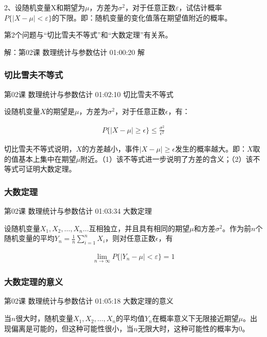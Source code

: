 \documentclass[UTF8]{ctexbook}
\begin{document}
2、设随机变量X和期望为$\mu$，方差为$\sigma^{2}$，对于任意正数$\varepsilon$，试估计概率$P\{|X-\mu| < \varepsilon \}$的下限。即：随机变量的变化值落在期望值附近的概率。

第2个问题与“切比雪夫不等式”和“大数定理”有关系。

解：第02课 数理统计与参数估计 01:00:20 解

\subsubsection{切比雪夫不等式}

第02课 数理统计与参数估计 01:02:10 切比雪夫不等式

设随机变量$X$的期望是$\mu$，方差为$\sigma^{2}$，对于任意正数$\epsilon$，有：

\begin{equation}
\begin{aligned}
P\{ |X-\mu| \geq \epsilon \} \leq \frac{\sigma^{2}}{\epsilon^{2}}
\end{aligned}
\end{equation}

切比雪夫不等式说明，$X$的方差越小，事件$|X-\mu| \geq \epsilon$发生的概率越大。即：$X$取的值基本上集中在期望$\mu$附近。（1）该不等式进一步说明了方差的含义；（2）该不等式可证明大数定理。

\subsubsection{大数定理}

第02课 数理统计与参数估计 01:03:34 大数定理

设随机变量$X_{1},X_{2},\dots,X_{n}\dots$互相独立，并且具有相同的期望$\mu$和方差$\sigma^{2}$。作为前$n$个随机变量的平均$Y_{n}=\frac{1}{n}\sum_{i=1}^{n}X_{i}$，则对任意正数$\epsilon$，有

\begin{equation}
\begin{aligned}
\underset{n \rightarrow \infty}{\lim} P \{ |Y_{n}-\mu| < \varepsilon \} = 1
\end{aligned}
\end{equation}

\subsubsection{大数定理的意义}

第02课 数理统计与参数估计 01:05:18 大数定理的意义

当$n$很大时，随机变量$X_{1},X_{2},\dots,X_{n}$的平均值$Y_{n}$在概率意义下无限接近期望$\mu$。出现偏离是可能的，但这种可能性很小，当$n$无限大时，这种可能性的概率为0。
\end{document}
